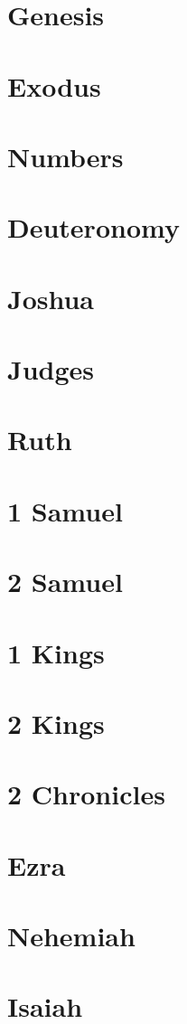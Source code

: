 \documentclass[twoside,twocolumn]{book} %
\newcommand\englishchaptertitle{}
\newcommand\hebrewchaptertitle{}
\newcommand\chap[2]{%
    \chapter[#1\hfill#2~~~]{#1}%
    \renewcommand\englishchaptertitle{#1}%
    \renewcommand\hebrewchaptertitle{#2}%
    \thispagestyle{empty}%
}
\newcommand\Greek[1]{{\sblg #1}}
\newcommand\Hebrew[1]{{\sblh #1}}
\begin{document}
    \frontmatter
    \pagestyle{empty}
    
    \clearpage
    
    \clearpage
    
    \clearpage
    
    \clearpage
    
    {\cleardoublepage}
    \tableofcontents
    \clearpage
    \mainmatter
    \makeatletter
    \@openrightfalse
    \makeatother
    \pagestyle{fancy}
    \chap{Genesis}{\Hebrew{בראשית}}
    
    
    
    \chap{Exodus}{\Hebrew{שמות}}
    
    
    
    
    
    \chap{Numbers}{\Hebrew{במדבר}}
    
    
    
    
    
    
    
    \chap{Deuteronomy}{\Hebrew{דברים}}
    
    
    
    \chap{Joshua}{\Hebrew{יהושע}}
    
    \chap{Judges}{\Hebrew{שופטים}}
    
    \chap{Ruth}{\Hebrew{רות}}
    
    
    
    
    \chap{1 Samuel}{\Hebrew{א שמואל}}
    
    \chap{2 Samuel}{\Hebrew{ב שמואל}}
    
    \chap{1 Kings}{\Hebrew{א מלכים}}
    
    
    \chap{2 Kings}{\Hebrew{ב מלכים}}
    
    
    
    \chap{2 Chronicles}{\Hebrew{ב הימים דברי}}
    
    
    \chap{Ezra}{\Hebrew{עזרא}}
    
    
    
    
    \chap{Nehemiah}{\Hebrew{נחמיה}}
    
    \chap{Isaiah}{\Hebrew{ישעה}}
\end{document}
